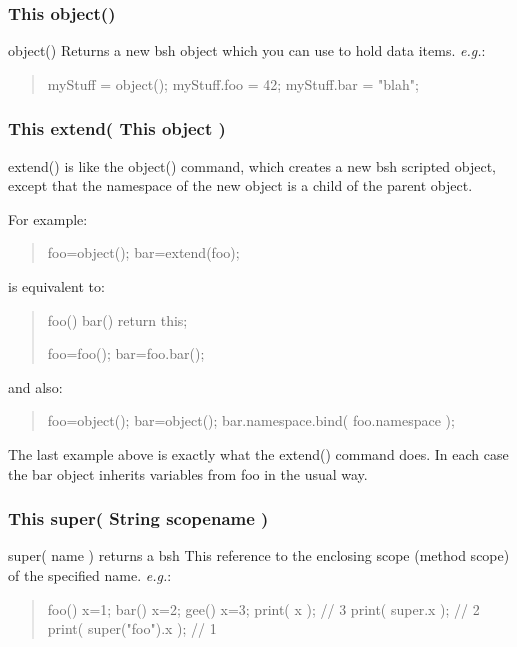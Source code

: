 \documentclass[twoside,11pt,nolof]{starlink}
\providecommand{\eg}{\textit{e.g.}}
\begin{document}
\subsubsection*{This object()}
object() Returns a new bsh object which you can use to hold data
items. \eg:
\begin{quote}
\begin{terminalv}
    myStuff = object();
    myStuff.foo = 42;
    myStuff.bar = "blah";
\end{terminalv}
\end{quote}

\subsubsection*{This extend( This object )}
extend() is like the object() command, which
creates a new bsh scripted object, except that the namespace of
the new object is a child of the parent object.

For example:
\begin{quote}
\begin{terminalv}
    foo=object();
    bar=extend(foo);
\end{terminalv}
\end{quote}
is equivalent to:
\begin{quote}
\begin{terminalv}
    foo() {
        bar() {
            return this;
        }
    }

    foo=foo();
    bar=foo.bar();
\end{terminalv}
\end{quote}
and also:
\begin{quote}
\begin{terminalv}
    foo=object();
    bar=object();
    bar.namespace.bind( foo.namespace );
\end{terminalv}
\end{quote}

The last example above is exactly what the extend() command does.
In each case the bar object inherits variables from foo in the usual way.

\subsubsection*{This super( String scopename )}
super( name ) returns a bsh This reference to the enclosing scope
(method scope) of the specified name. \eg:
\begin{quote}
\begin{terminalv}
    foo() {
        x=1;
        bar() {
            x=2;
            gee() {
                x=3;
                print( x ); // 3
                print( super.x ); // 2
                print( super("foo").x ); // 1
            }
        }
    }
\end{terminalv}
\end{quote}
\end{document}
